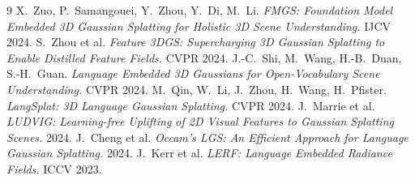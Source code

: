 \documentclass[11pt,a4paper]{article}
\begin{document}
\begin{thebibliography}{9}
 X.~Zuo, P.~Samangouei, Y.~Zhou, Y.~Di, M.~Li. \emph{FMGS: Foundation Model Embedded 3D Gaussian Splatting for Holistic 3D Scene Understanding.} IJCV 2024.
 S.~Zhou et al. \emph{Feature 3DGS: Supercharging 3D Gaussian Splatting to Enable Distilled Feature Fields.} CVPR 2024.
 J.-C.~Shi, M.~Wang, H.-B.~Duan, S.-H.~Guan. \emph{Language Embedded 3D Gaussians for Open-Vocabulary Scene Understanding.} CVPR 2024.
 M.~Qin, W.~Li, J.~Zhou, H.~Wang, H.~Pfister. \emph{LangSplat: 3D Language Gaussian Splatting.} CVPR 2024.
 J.~Marrie et al. \emph{LUDVIG: Learning-free Uplifting of 2D Visual Features to Gaussian Splatting Scenes.} 2024.
 J.~Cheng et al. \emph{Occam's LGS: An Efficient Approach for Language Gaussian Splatting.} 2024.
 J.~Kerr et al. \emph{LERF: Language Embedded Radiance Fields.} ICCV 2023.
\end{thebibliography}
\end{document}
